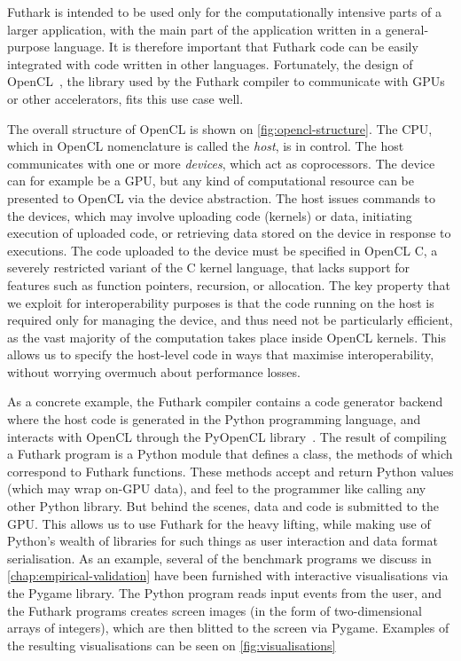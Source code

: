 Futhark is intended to be used only for the computationally intensive
parts of a larger application, with the main part of the application
written in a general-purpose language.  It is therefore important that
Futhark code can be easily integrated with code written in other
languages.  Fortunately, the design of
OpenCL~\cite{Stone:2010:OPP:622179.1803953}, the library used by the
Futhark compiler to communicate with GPUs or other accelerators, fits
this use case well.

The overall structure of OpenCL is shown on
\cref{fig:opencl-structure}.  The CPU, which in OpenCL nomenclature is
called the \textit{host}, is in control.  The host communicates with
one or more \textit{devices}, which act as coprocessors.  The device
can for example be a GPU, but any kind of computational resource can
be presented to OpenCL via the device abstraction.  The host issues
commands to the devices, which may involve uploading code (kernels) or
data, initiating execution of uploaded code, or retrieving data stored
on the device in response to executions.  The code uploaded to the
device must be specified in OpenCL C, a severely restricted variant of
the C kernel language, that lacks support for features such as
function pointers, recursion, or allocation.  The key property that we
exploit for interoperability purposes is that the code running on the
host is required only for managing the device, and thus need not be
particularly efficient, as the vast majority of the computation takes
place inside OpenCL kernels.  This allows us to specify the host-level
code in ways that maximise interoperability, without worrying overmuch
about performance losses.

As a concrete example, the Futhark compiler contains a code generator
backend where the host code is generated in the Python programming
language, and interacts with OpenCL through the PyOpenCL
library~\cite{kloeckner_pycuda_2012}.  The result of compiling a
Futhark program is a Python module that defines a class, the methods
of which correspond to Futhark functions.  These methods accept and
return Python values (which may wrap on-GPU data), and feel to the
programmer like calling any other Python library.  But behind the
scenes, data and code is submitted to the GPU.  This allows us to use
Futhark for the heavy lifting, while making use of Python's wealth of
libraries for such things as user interaction and data format
serialisation.  As an example, several of the benchmark programs we
discuss in \ref{chap:empirical-validation} have been furnished with
interactive visualisations via the Pygame library.  The Python program
reads input events from the user, and the Futhark programs creates
screen images (in the form of two-dimensional arrays of integers),
which are then blitted to the screen via Pygame.  Examples of the
resulting visualisations can be seen on \cref{fig:visualisations}

